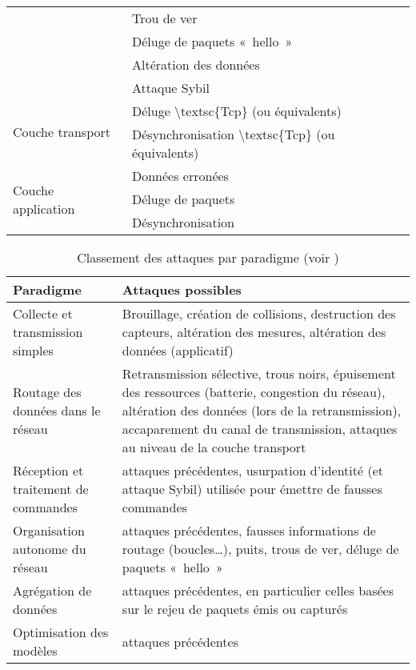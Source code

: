 \begin{table}[!ht]
\begin{small}
\begin{tabular}{m{}|p{}}
                & \num{Trou de ver}\\
                & \num{Déluge de paquets « hello »}\\
                & \num{Altération des données}\\
                & \num{Attaque Sybil}\\
            \midrule
            \multirow{2}{*}{Couche transport}%
                & \num{Déluge \textsc{Tcp} (ou équivalents)}\\
                & \num{Désynchronisation \textsc{Tcp} (ou équivalents)}\\
            \midrule
            \multirow{3}{*}{Couche application}%
                & \num{Données erronées}\\
                & \num{Déluge de paquets}\\
                & \num{Désynchronisation}\\
            \bottomrule
        \end{tabular}
    \end{small}
\end{table}
\begin{table}[!ht]
    \caption{Classement des attaques par paradigme (voir )}\label{ea:tab:paradigm}
    \centering
    \medskip
    \begin{small}
        \begin{tabular}{m{}|m{}}
            \toprule
            \textbf{Paradigme} & \textbf{Attaques possibles}\\
            \midrule
            Collecte et transmission simples & Brouillage, création de collisions, destruction des capteurs, altération des mesures, altération des données (applicatif)\\
            \midrule
            Routage des données dans le réseau & Retransmission sélective, trous noirs, épuisement des ressources (batterie, congestion du réseau), altération des données (lors de la retransmission), accaparement du canal de transmission, attaques au niveau de la couche transport\\
            \midrule
            Réception et traitement de commandes & attaques précédentes, usurpation d'identité (et attaque Sybil) utilisée pour émettre de fausses commandes\\
            \midrule
            Organisation autonome du réseau & attaques précédentes, fausses informations de routage (boucles\dots), puits, trous de ver, déluge de paquets « hello »\\
            \midrule
            Agrégation de données & attaques précédentes, en particulier celles basées sur le rejeu de paquets émis ou capturés\\
            \midrule
            Optimisation des modèles & attaques précédentes\\
            \bottomrule
         \end{tabular}
     \end{small}
\end{table}

